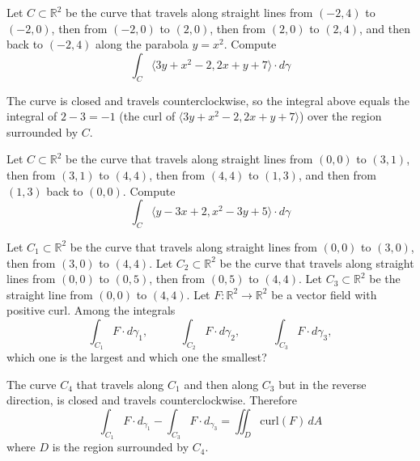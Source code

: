 \documentclass{ximera}
\begin{document}
\begin{exercise}
    Let $C \subset \mathbb{R}^2$ be the curve that travels along straight lines from $(-2,4)$ to $(-2,0)$, then from $(-2,0)$ to $(2,0)$, then from $(2,0)$ to $(2,4)$, and then back to $(-2,4)$ along the parabola $y = x^2$.  Compute
    \[
        \int_C \langle 3 y + x^2 - 2,  2x + y + 7 \rangle \cdot  d \gamma 
    \]
    
    \begin{hint}
    The curve is closed and travels counterclockwise, so the integral above equals the integral of $ 2-3 =- 1 $ (the curl of $\langle 3 y + x^2 - 2,  2x + y + 7 \rangle  $) over the region surrounded by $C$. 
\end{hint}
\end{exercise}
\begin{exercise}
    Let $C \subset \mathbb{R}^2$ be the curve that travels along straight lines from $(0,0)$ to $(3,1)$,  then from $(3,1) $ to $(4,4)$, then from $(4,4) $ to $(1,3)$, and then from $(1,3)$ back to $(0,0)$. Compute
    \[
        \int_C \langle y - 3 x + 2,  x^2 - 3 y + 5 \rangle \cdot  d \gamma 
    \]
\end{exercise}




\begin{exercise}
    Let $C_1 \subset \mathbb{R}^2$ be the curve that travels along straight lines from $(0,0)$ to $(3,0)$,  then from $(3,0) $ to $(4,4)$. Let $C_2 \subset \mathbb{R}^2$ be the curve that travels along straight lines from $(0,0)$ to $(0,5)$,  then from $(0,5) $ to $(4,4)$. Let $C_3 \subset \mathbb{R}^2$ be the straight line from $(0,0)$ to $(4,4)$. Let $F : \mathbb{R}^2 \to \mathbb{R}^2$ be a vector field with positive curl. Among the integrals
    \[    \int_{C_1} F\cdot  d \gamma_1  , \,\,\,\,\,\,\,\,\,\,\,\,\,\,\,\,\,   \int_{C_2} F\cdot  d \gamma_2  , \,\,\,\,\,\,\,\,\, \,\,\,\,\,\,\,\,  \int_{C_3} F\cdot  d \gamma_3  ,        \]
    which one is the largest and which one the smallest?

    \begin{hint}
        The curve $C_4$ that travels along $C_1$ and then along $C_3$ but in the reverse direction, is closed and travels counterclockwise. Therefore
        \[      \int_{C_1} F \cdot d_{\gamma _1} - \int_{C_3} F \cdot d _{\gamma _3} = \iint_{D} \text{curl}(F) \, dA                     \]
        where $D$ is the region surrounded by $C_4$. 
    \end{hint}
\end{exercise}
\end{document}
